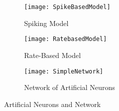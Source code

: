 \begin{figure}
\centering
\begin{subfigure}{.4\textwidth}
  \centering
  \texttt{[image: SpikeBasedModel]}
  \captionsetup{justification=centering, skip=5pt}
  \caption[Spiking Model]{Spiking Model}
  \label{fig:simpleNetwork}
\end{subfigure}%
\begin{subfigure}{.4\textwidth}
  \centering
  \texttt{[image: RatebasedModel]}
  \captionsetup{justification=centering, skip=5pt}
  \caption{Rate-Based Model}
  \label{fig:cellContents}
\end{subfigure}
\begin{subfigure}{.9\textwidth}
  \centering
  \texttt{[image: SimpleNetwork]}
  \captionsetup{justification=centering, skip=5pt}
  \caption{Network of Artificial Neurons}
  \label{fig:cellContents}
\end{subfigure}
\captionsetup{justification=centering, skip=6pt}
\caption[Artificial Neural Network]{Artificial Neurons and Network}
\label{fig:Artificial Neural Network}
\end{figure}

